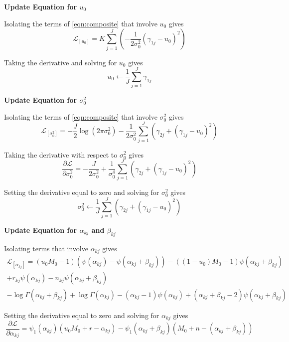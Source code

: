 \documentclass[10pt, letterpaper]{article}
\begin{document}
{\bf Update Equation for $u_0$ }

Isolating the terms of \eqref{eqn:composite} that involve $u_0$ gives
\begin{equation}
\mathcal{L}_{[u_0]} = K\sum_{j=1}^J\left(-\frac{1}{2\sigma_0^2}(\gamma_{1j}-u_0)^2\right)
\end{equation}

Taking the derivative and solving for $u_0$ gives
\begin{equation}
u_0 \leftarrow \frac{1}{J}\sum_{j=1}^J \gamma_{1j} 
\end{equation}

{\bf Update Equation for $\sigma_0^2$ }

Isolating the terms of \eqref{eqn:composite} that involve $\sigma^2_0$ gives
\begin{equation}
\mathcal{L}_{[\sigma^2_0]} = -\frac{J}{2}\log(2\pi\sigma^2_0) -\frac{1}{2\sigma_0^2}\sum_{j=1}^J\left(\gamma_{2j} + (\gamma_{1j}-u_0)^2 \right)
\end{equation}

Taking the derivative with respect to $\sigma^2_0$ gives
\begin{equation}
\frac{\partial \mathcal{L}}{\partial \sigma^2_0} = -\frac{J}{2\sigma^2_0} +\frac{1}{\sigma^4_0}\sum_{j=1}^J\left(\gamma_{2j} + (\gamma_{1j}-u_0)^2\right)
\end{equation}

Setting the derivative equal to zero and solving for $\sigma^2_0$ gives
\begin{equation}
\sigma^2_0 \leftarrow \frac{1}{J}\sum_{j=1}^J\left(\gamma_{2j} + (\gamma_{1j}-u_0)^2\right)
\end{equation}

{\bf Update Equation for $\alpha_{kj}$ and $\beta_{kj}$ }

Isolating terms that involve $\alpha_{kj}$ gives
\begin{multline}
\mathcal{L}_{[\alpha_{kj}]} = (u_0M_0 -1)(\psi(\alpha_{kj}) - \psi(\alpha_{kj}+\beta_{kj})) -((1-u_0)M_0-1)\psi(\alpha_{kj}+\beta_{kj}) \\
+ r_{kj}\psi(\alpha_{kj})-n_{kj}\psi(\alpha_{kj}+\beta_{kj}) \\
 - \log \Gamma (\alpha_{kj}+\beta_{kj}) + \log \Gamma(\alpha_{kj}) -(\alpha_{kj}-1)\psi(\alpha_{kj})+(\alpha_{kj}+\beta_{kj}-2)\psi(\alpha_{kj}+\beta_{kj})
\end{multline}

Setting the derivative equal to zero and solving for $\alpha_{kj}$ gives
\begin{equation}
 \frac{\partial \mathcal{L}}{\partial \alpha_{kj}} = \psi_1(\alpha_{kj})(u_0M_0+r-\alpha_{kj}) - \psi_1(\alpha_{kj}+\beta_{kj})(M_0+n-(\alpha_{kj}+\beta_{kj}))
\end{equation}
\end{document}
